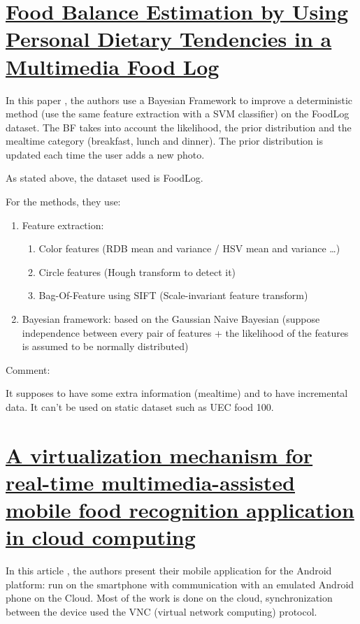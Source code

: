 \section{\href{http://ieeexplore.ieee.org/xpl/login.jsp?tp=&arnumber=6548059}{Food Balance Estimation by Using Personal Dietary Tendencies in a Multimedia Food Log}}

In this paper \cite{Aizawa2013}, the authors use a Bayesian Framework to improve a deterministic method (use the same feature extraction with a SVM classifier) on the FoodLog dataset. The BF takes into account the likelihood, the prior distribution and the mealtime category (breakfast, lunch and dinner). The prior distribution is updated each time the user adds a new photo.

As stated above, the dataset used is FoodLog.

For the methods, they use:
\begin{enumerate}
    \item Feature extraction:
    \begin{enumerate}
        \item Color features (RDB mean and variance / HSV mean and variance …)
        \item Circle features (Hough transform to detect it)
        \item Bag-Of-Feature using SIFT (Scale-invariant feature transform)
    \end{enumerate}
    \item Bayesian framework: based on the Gaussian Naive Bayesian (suppose independence between every pair of features + the likelihood of the features is assumed to be normally distributed)
\end{enumerate}

Comment:

It supposes to have some extra information (mealtime) and to have incremental data. It can’t be used on static dataset such as UEC food 100.


\section{\href{http://link.springer.com/article/10.1007\%2Fs10586-015-0468-2}{A virtualization mechanism for real-time multimedia-assisted mobile food recognition application in cloud computing}}

In this article \cite{Pouladzadeh2015a}, the authors present their mobile application for the Android platform: run on the smartphone with communication with an emulated Android phone on the Cloud. Most of the work is done on the cloud, synchronization between the device used the VNC (virtual network computing) protocol.

